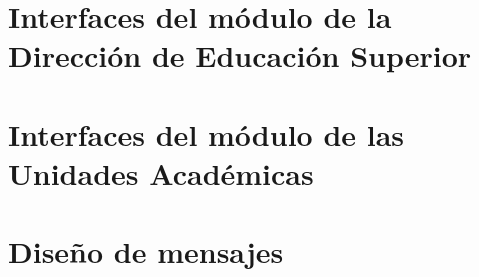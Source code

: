 \documentclass[10pt]{book}
\begin{document}
        \chapter{Interfaces del módulo de la Dirección de Educación Superior}
        \label{ch:subsistemaDES}
        
        
        \chapter{Interfaces del módulo de las Unidades Académicas}
        \label{ch:subsistemaUA}
        
        
        \appendix
        
        \chapter{Diseño de mensajes}
        \label{ch:mensajes}
        
        
        
        \clossing
\end{document}
